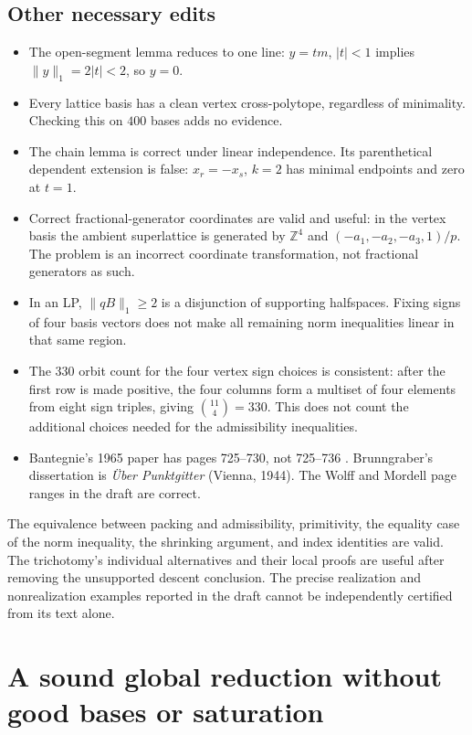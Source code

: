 \documentclass[11pt,reqno]{amsart}
\theoremstyle{definition}
\newcommand{\Z}{\mathbb Z}
\newcommand{\norm}[1]{\lVert #1\rVert_1}
\begin{document}
\subsection{Other necessary edits}
\begin{itemize}
\item The open-segment lemma reduces to one line:
$y=tm$, $|t|<1$ implies $\norm{y}=2|t|<2$, so $y=0$.
\item Every lattice basis has a clean vertex cross-polytope, regardless
of minimality. Checking this on $400$ bases adds no evidence.
\item The chain lemma is correct under linear independence. Its
parenthetical dependent extension is false: $x_r=-x_s$, $k=2$ has
minimal endpoints and zero at $t=1$.
\item Correct fractional-generator coordinates are valid and useful:
in the vertex basis the ambient superlattice is generated by $\Z^4$
and $(-a_1,-a_2,-a_3,1)/p$. The problem is an incorrect coordinate
transformation, not fractional generators as such.
\item In an LP, $\norm{qB}\ge2$ is a disjunction of supporting
halfspaces. Fixing signs of four basis vectors does not make all
remaining norm inequalities linear in that same region.
\item The $330$ orbit count for the four vertex sign choices is
consistent: after the first row is made positive, the four columns
form a multiset of four elements from eight sign triples, giving
$\binom{11}{4}=330$. This does not count the additional choices
needed for the admissibility inequalities.
\item Bantegnie's 1965 paper has pages 725--730, not 725--736
\cite{Bantegnie}. Brunngraber's dissertation is \emph{\"Uber Punktgitter}
(Vienna, 1944). The Wolff and Mordell page ranges in the draft are correct.
\end{itemize}

The equivalence between packing and admissibility, primitivity, the
equality case of the norm inequality, the shrinking argument, and index identities
are valid. The trichotomy's individual alternatives and their local
proofs are useful after removing the unsupported descent conclusion.
The precise realization and nonrealization examples reported in the
draft cannot be independently certified from its text alone.

\section{A sound global reduction without good bases or saturation}\label{sec:global}
\end{document}
